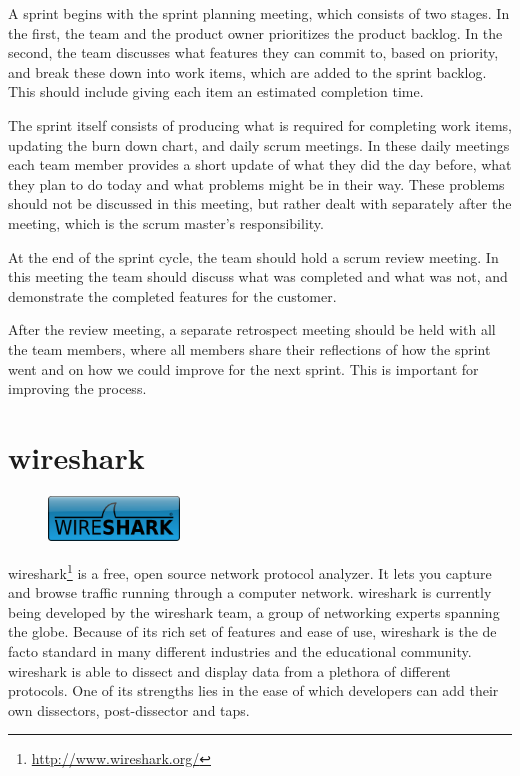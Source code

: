 A sprint begins with the sprint planning meeting, which consists of two stages. In the first, the team and the product owner prioritizes the product backlog. In the second, the team discusses what features they can commit to, based on priority, and break these down into work items, which are added to the sprint backlog. This should include giving each item an estimated completion time.

The sprint itself consists of producing what is required for completing work
items, updating the burn down chart, and daily \Gls{scrum} meetings. In these daily
meetings each team member provides a short update of what they did the day
before, what they plan to do today and what problems might be in their way.
These problems should not be discussed in this meeting, but rather dealt with
separately after the meeting, which is the \Gls{scrum} master's responsibility.

At the end of the sprint cycle, the team should hold a \Gls{scrum} review meeting.
In this meeting the team should discuss what was completed and what was not, and
demonstrate the completed features for the customer.	

After the review meeting, a separate retrospect meeting should be held with all
the team members, where all members share their reflections of how the sprint
went and on how we could improve for the next sprint. This is important for improving the
process.


\section{\Gls{wireshark}}
\label{sec:pre:wireshark}
\begin{figure}
	\vspace{-10pt}
	\includegraphics[width=3.5cm]{./planning/img/wireshark_logo}
	\vspace{-20pt}
\end{figure}
\Gls{wireshark}\footnote{\url{http://www.wireshark.org/}} is a free, open source
network \gls{protocol} analyzer. It lets you capture and browse traffic running
through a computer network. \Gls{wireshark} is currently being developed by the
\Gls{wireshark} team, a group of networking experts spanning the globe.\cite{WiresharkORG} Because of
its rich set of features and ease of use, \Gls{wireshark} is the de facto standard in
many different industries and the educational community. \Gls{wireshark} is able to
dissect and display data from a plethora of different \glspl{protocol}. One of its
strengths lies in the ease of which developers can add their own \glspl{dissector},
\gls{post-dissector} and taps.

